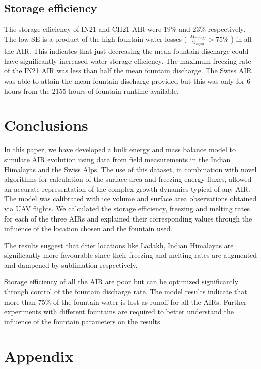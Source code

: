 \documentclass[utf8]{frontiersSCNS} %
\begin{document}
\subsection{Storage efficiency}

The storage efficiency of IN21 and CH21 AIR were $19\%$ and $23\%$ respectively. The low SE is a product of the
high  fountain water losses ( $\frac{M_{runoff}}{M_{input}}> 75 \%$ ) in all the AIR. This indicates that just
decreasing the mean fountain discharge could have significantly increased water storage efficiency.  The maximum
freezing rate of the IN21 AIR was less than half the mean fountain discharge. The Swiss AIR was able to attain the
mean fountain discharge provided but this was only for 6 hours from the 2155 hours of fountain runtime available.

\section{Conclusions}

In this paper, we have developed a bulk energy and mass balance model to simulate AIR evolution using data from
field measurements in the Indian Himalayas and the Swiss Alps. The use of this dataset, in combination with novel
algorithms for calculation of the surface area and freezing energy fluxes, allowed an accurate representation of
the complex growth dynamics typical of any AIR. The model was calibrated with ice volume and surface area
observations obtained via UAV flights. We calculated the storage efficiency, freezing and melting rates for each of
the three AIRs and explained their corresponding values through the influence of the location chosen and the
fountain used.

The results suggest that drier locations like Ladakh, Indian Himalayas are significantly more favourable since
their freezing and melting rates are augmented and dampened by sublimation respectively.

Storage efficiency of all the AIR are poor but can be optimized significantly through control of the fountain
discharge rate.  The model results indicate that more than 75\% of the fountain water is lost as runoff for all the
AIRs.  Further experiments with different fountains are required to better understand the influence of the fountain
parameters on the results.

\section{Appendix}
\end{document}

